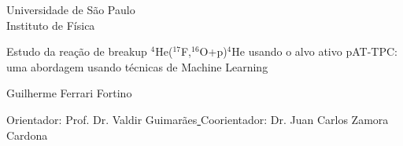 \documentclass[a4paper,12pt,oneside]{book}
\begin{document}
\pagestyle{plain}
\renewcommand*\contentsname{Sumário}
\renewcommand{\listfigurename}{Lista de figuras}
\renewcommand{\listoftables}{Tabelas}
\renewcommand{\listofalgorithms}{Lista de algoritmos}
\makeatletter
\renewcommand{\@chapapp}{Capítulo}
\makeatother



\thispagestyle{empty}
\begin{center}

	{\fontsize{16}{16} \selectfont Universidade de S\~ao Paulo \\}
	\vspace{0.1cm}
	{\fontsize{16}{16} \selectfont Instituto de F\'{i}sica}
    \vspace{2.2cm}

	{\fontsize{22}{22}\selectfont Estudo da reação de breakup $^4$He($^{17}$F,$^{16}$O+p)$^4$He usando o alvo ativo pAT-TPC: uma abordagem usando técnicas de Machine Learning\par}
    \vspace{2cm}


    {\fontsize{18}{18}\selectfont Guilherme Ferrari Fortino\par}

    \vspace{1.4cm}

\end{center}

\leftskip 6cm
\begin{flushright}	
\leftskip 6cm
Orientador: Prof. Dr.  Valdir Guimarães\underline{ \hskip 5cm  } 
\leftskip 6cm
Coorientador: Dr. Juan Carlos Zamora Cardona  \underline{ \hskip 5cm  } 
\end{flushright}	

\vspace{0.6cm}    

\end{document}
